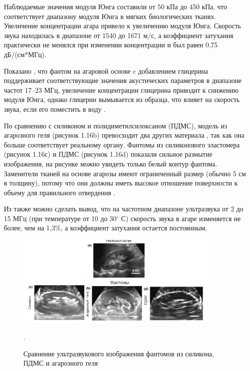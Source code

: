 Наблюдаемые значения модуля Юнга составили от 50 кПа до 450 кПа, что соответствует диапазону модуля Юнга в мягких биологических тканях. Увеличение концентрации агара привело к увеличению модуля Юнга. Скорость звука находилась в диапазоне от 1540 до 1671 м/с, а коэффициент затухания практически не менялся при изменении концентрации и был равен 0,75 дБ/(см*МГц). 

Показано  \cite{litlink49}, что фантом на агаровой основе c добавлением глицерина поддерживает соответствующие значения акустических параметров в диапазоне частот 17–23 МГц, увеличение концентрации глицерина приводит к снижению модуля Юнга, однако глицерин вымывается из образца, что влияет на скорость звука, если его поместить в воду  \cite{litlink50}. 

По сравнению с силиконом и полидиметилсилоксаном (ПДМС), модель из агарозного геля (рисунок 1.16b) превосходит два других материала \cite{litlink51}, так как она больше соответствует реальному органу. Фантомы из силиконового эластомера (рисунок 1.16с) и ПДМС (рисунок 1.16d) показали сильное размытие изображения, на рисунке можно увидеть только белый контур фантома. Заменители тканей на основе агарозы имеют ограниченный размер (обычно 5 см в толщину), потому что они должны иметь высокое отношение поверхности к объему для правильного отвердения \cite{litlink52}.

Из \cite{litlink44} также можно сделать вывод, что на частотном диапазоне ультразвука от 2 до 15 МГц (при температуре от 10 до 30$^{\circ}$ С) скорость звука в агаре изменяется не более, чем на 1,3\%, а коэффициент затухания остается постоянным. 

\begin{figure}[H]
\begin{center}
\includegraphics[width=0.9\textwidth]{Рисунки/УЗИ.png}
\caption{\centering Сравнение ультразвукового изображения фантомов из силикона, ПДМС и агарозного геля}.
\label{оболочка}
\end{center}
\end{figure}

